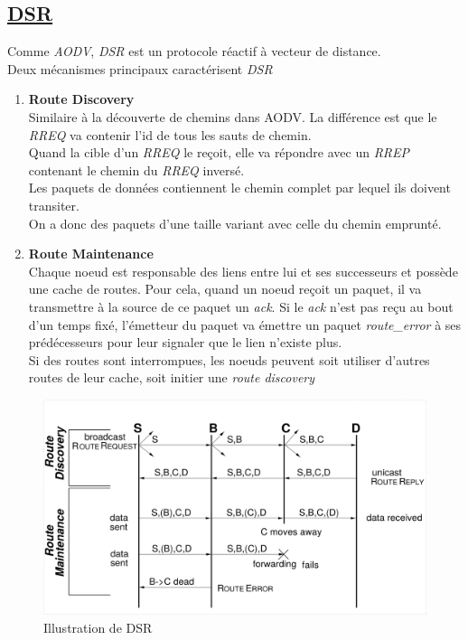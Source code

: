 \subsection{\underline{DSR}}%
    Comme \textit{AODV}, \textit{DSR} est un protocole réactif à vecteur de distance.\\
    Deux mécanismes principaux caractérisent \textit{DSR}\\
    \begin{enumerate}
        \item \textbf{Route Discovery}\\
            Similaire à la découverte de chemins dans AODV. La différence est que le \textit{RREQ} va contenir l'id de tous les sauts de chemin.\\
            Quand la cible d'un \textit{RREQ} le reçoit, elle va répondre avec un \textit{RREP} contenant le chemin du \textit{RREQ} inversé.\\
            Les paquets de données contiennent le chemin complet par lequel ils doivent transiter.\\
            On a donc des paquets d'une taille variant avec celle du chemin emprunté.
        \item \textbf{Route Maintenance}\\
            Chaque noeud est responsable des liens entre lui et ses successeurs et possède une cache de routes.
            Pour cela, quand un noeud reçoit un paquet, il va transmettre à la source de ce paquet
            un \textit{ack}. Si le \textit{ack} n'est pas reçu au bout d'un temps fixé, l'émetteur du paquet va émettre
            un paquet \textit{route\_error} à ses prédécesseurs pour leur signaler que le lien n'existe plus.\\
            Si des routes sont interrompues, les noeuds peuvent soit utiliser d'autres routes de leur cache, soit initier une \textit{route discovery}
    \end{enumerate}
    \begin{figure}[H]
        \centering
        \includegraphics[scale=0.12]{images/ack_dsr.png}
        \caption{Illustration de DSR \cite{dsr_for_adHoc_network}}
        \label{dsr_image}
    \end{figure}